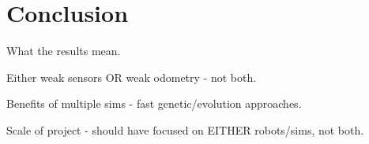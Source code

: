 \section{Conclusion}
What the results mean.

Either weak sensors OR weak odometry - not both.

Benefits of multiple sims - fast genetic/evolution approaches.

Scale of project - should have focused on EITHER robots/sims, not both.
